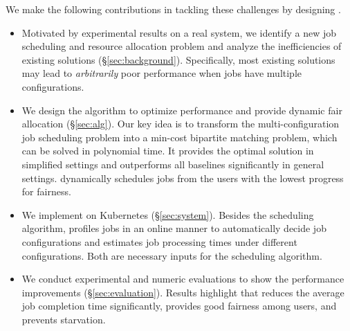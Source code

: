 We make the following contributions in tackling these challenges by designing \name. 

\begin{itemize}
\item Motivated by experimental results on a real system, we identify a new job scheduling and resource allocation problem and analyze the inefficiencies of existing solutions (\S\ref{sec:background}). Specifically, most existing solutions may lead to \emph{arbitrarily} poor performance when jobs have multiple configurations. %
\item We design the \name algorithm to optimize performance and provide dynamic fair allocation (\S\ref{sec:alg}). Our key idea is to transform the multi-configuration job scheduling problem into a min-cost bipartite matching problem, which can be solved in polynomial time. It provides the optimal solution in simplified settings and outperforms all baselines significantly in general settings. \name dynamically schedules jobs from the users with the lowest progress for fairness.
\item We implement \name on Kubernetes (\S\ref{sec:system}). Besides the scheduling algorithm, \name profiles jobs in an online manner to automatically decide job configurations and estimates job processing times under different configurations. Both are necessary inputs for the scheduling algorithm. 
\item We conduct experimental and numeric evaluations to show the performance improvements (\S\ref{sec:evaluation}). Results highlight that \name reduces the average job completion time significantly, provides good fairness among users, and prevents starvation.
\end{itemize}









